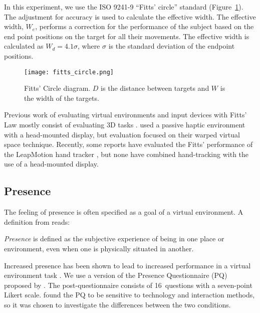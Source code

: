 In this experiment, we use the ISO 9241-9 ``Fitts' circle'' standard (Figure~\ref{fig:ph_fitts_circle}).
The adjustment for accuracy \citep{welford_fundamentals_1968} is used to calculate the effective width.
The effective width, $W_e$, performs a correction for the performance of the subject based on the end point positions on the target for all their movements.
The effective width is calculated as $W_d=4.1\sigma$, where $\sigma$ is the standard deviation of the endpoint positions.

\begin{figure}
    \centering
    \texttt{[image: fitts\_circle.png]}
    \caption{Fitts' Circle diagram. $D$ is the distance between targets and $W$ is the width of the targets.}
    \label{fig:ph_fitts_circle}
\end{figure}

Previous work of evaluating virtual environments and input devices with Fitts’ Law mostly consist of evaluating 3D tasks \citep{chun_evaluating_2004,liu_comparing_2009,teather_evaluating_2010}.
\citet{kohli_redirected_2012} used a passive haptic environment with a head-mounted display, but evaluation focused on their warped virtual space technique.
Recently, some reports have evaluated the Fitts’ performance of the LeapMotion hand tracker \citep{coelho_pointing_2014,seixas_one_2015}, but none have combined hand-tracking with the use of a head-mounted display.

\subsection{Presence}

The feeling of presence is often specified as a goal of a virtual environment.
A definition from \citet{witmer_measuring_1998} reads:
\begin{displayquote}
\textit{Presence} is defined as the subjective experience of being in one place or environment, even when one is physically situated in another.
\end{displayquote}
Increased presence has been shown to lead to increased performance in a virtual environment task \citep{youngblut_relationship_2003}.
We use a version of the Presence Questionnaire (PQ) proposed by \citet{witmer_measuring_1998}.
The post-questionnaire consists of 16~questions with a seven-point Likert scale.
\citet{nystad_comparison_2004} found the PQ to be sensitive to technology and interaction methods, so it was chosen to investigate the differences between the two conditions.

